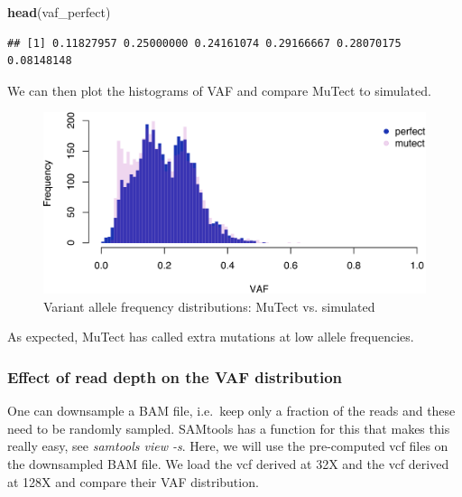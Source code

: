 \documentclass[]{article}
\newenvironment{Shaded}{\begin{snugshade}}{\end{snugshade}}
\newcommand{\KeywordTok}[1]{\textcolor[rgb]{0.13,0.29,0.53}{\textbf{#1}}}
\newcommand{\NormalTok}[1]{#1}
\begin{document}
\begin{Shaded}
\begin{Highlighting}[]
\KeywordTok{head}\NormalTok{(vaf_perfect)}
\end{Highlighting}
\end{Shaded}

\begin{verbatim}
## [1] 0.11827957 0.25000000 0.24161074 0.29166667 0.28070175 0.08148148
\end{verbatim}

We can then plot the histograms of VAF and compare MuTect to simulated.

\begin{figure}

{\centering \includegraphics{src_guide_files/figure-latex/fig1-1} 

}

\caption{\label{fig1}Variant allele frequency distributions: MuTect vs. simulated}\label{fig:fig1}
\end{figure}

As expected, MuTect has called extra mutations at low allele
frequencies.

\hypertarget{effect-of-read-depth-on-the-vaf-distribution}{%
\subsubsection{Effect of read depth on the VAF
distribution}\label{effect-of-read-depth-on-the-vaf-distribution}}

One can downsample a BAM file, i.e.~keep only a fraction of the reads
and these need to be randomly sampled. SAMtools has a function for this
that makes this really easy, see \emph{samtools view -s}. Here, we will
use the pre-computed vcf files on the downsampled BAM file. We load the
vcf derived at 32X and the vcf derived at 128X and compare their VAF
distribution.
\end{document}
